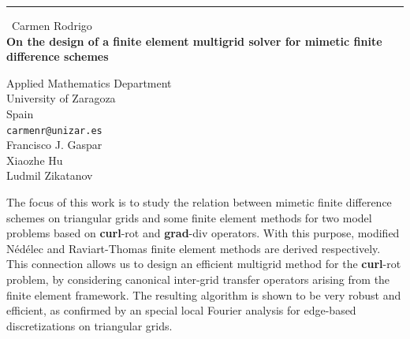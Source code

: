 \documentclass{report}
\begin{document}
\begin{center}
\rule{6in}{1pt} \
{\large Carmen Rodrigo \\
{\bf On the design of a finite element multigrid solver for mimetic finite difference schemes}}

Applied Mathematics Department \\ University of Zaragoza \\ Spain
\\
{\tt carmenr@unizar.es}\\
Francisco J. Gaspar\\
Xiaozhe Hu\\
Ludmil Zikatanov\end{center}

The focus of this work is to study the relation between mimetic finite
difference schemes on triangular grids and some finite element methods
for two model problems based on \textbf{curl}-rot and \textbf{grad}-div
operators. With this purpose, modified N\'ed\'elec and Raviart-Thomas
finite element methods are derived respectively. This connection allows
us to design an efficient multigrid method for the \textbf{curl}-rot
problem, by considering canonical inter-grid transfer operators arising
from the finite element framework. The resulting algorithm is shown to be
very robust and efficient, as confirmed by an special local Fourier
analysis for edge-based discretizations on triangular grids.
\end{document}
